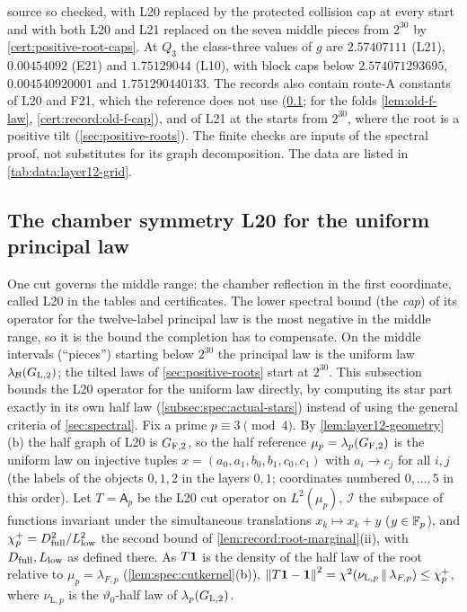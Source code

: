 \begin{certificate}
source so checked, with L20 replaced by the protected collision cap
at every start and with both L20 and L21 replaced on the seven middle pieces
from $2^{30}$ by \cref{cert:positive-root-caps}. At $Q_3$ the
class-three values of $g$ are $2.57407111$ (L21), $0.00454092$ (E21) and
$1.75129044$ (L10), with block caps
below $2.574071293695$, $0.004540920001$ and $1.751290440133$. The records also
contain route-A constants of L20 and F21, which the reference does not use
(\cref{subsec:middle-l20}; for the folds \cref{lem:old-f-law},
\cref{cert:record:old-f-cap}), and of L21 at the starts from $2^{30}$, where the
root is a positive tilt (\cref{sec:positive-roots}). The finite
checks are inputs of the spectral proof, not substitutes for its graph
decomposition. The data are listed in \cref{tab:data:layer12-grid}.
\end{certificate}

\subsection{The chamber symmetry L20 for the uniform principal law}\label{subsec:middle-l20}

One cut governs the middle range: the chamber reflection in the
first coordinate, called L20 in the tables and certificates. The
lower spectral bound (the \emph{cap}) of its operator for the
twelve-label principal law is the most negative in the middle
range, so it is the bound the completion has to compensate. On the
middle intervals (``pieces'') starting below $2^{30}$ the
principal law is the uniform law $\lambda_{\mathcal B}(G_{\rm L,2})$; the
tilted laws of \cref{sec:positive-roots} start at $2^{30}$. This
subsection bounds the L20 operator for the uniform law directly,
by computing its star part exactly in its own half law
(\cref{subsec:spec:actual-stars}) instead of using the general
criteria of \cref{sec:spectral}. Fix
a prime $p\equiv3\pmod4$. By \cref{lem:layer12-geometry}(b) the half graph of
L20 is $G_{\rm F,2}$, so the half reference $\mu_p=\lambda_p(G_{\rm F,2})$ is
the uniform law on injective tuples $x=(a_0,a_1,b_0,b_1,c_0,c_1)$ with
$a_i\to c_j$ for all $i,j$ (the labels of the objects $0,1,2$ in the layers
$0,1$; coordinates numbered $0,\dots,5$ in this order). Let $T=\mathsf A_p$ be
the L20 cut operator on $L^2(\mu_p)$, $\mathcal I$ the subspace of functions
invariant under the simultaneous translations $x_k\mapsto x_k+y$
($y\in\mathbb F_p$), and $\chi^+_p=D_{\rm full}^2/L_{\rm low}^2$ the second bound of
\cref{lem:record:root-marginal}(ii), with $D_{\rm full},L_{\rm low}$ as defined
there. As $T\mathbf 1$ is the density of the half law
of the root relative to $\mu_p=\lambda_{F,p}$ (\cref{lem:spec:cutkernel}(b)),
$\left\|T\mathbf 1-\mathbf 1\right\|^2=\chi^2(\nu_{\mathrm L,p}\,\|\,\lambda_{F,p})\le\chi^+_p$,
where $\nu_{\mathrm L,p}$ is the $\vartheta_0$-half law of $\lambda_p(G_{{\rm L},2})$.

